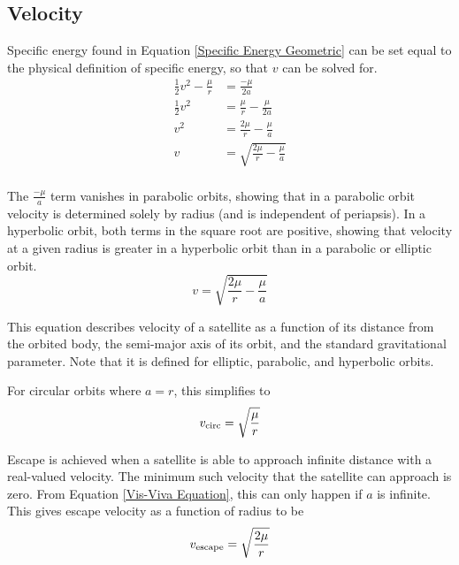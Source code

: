 \documentclass[../basicOrbitalDynamics.tex]{subfiles}
\begin{document}
\bigskip\bigskip
\subsection{Velocity}\label{sec:Velocity}

Specific energy found in Equation  \eqref{Specific Energy Geometric} can be set equal to the physical definition of specific energy, so that $v$ can be solved for.
\begin{align*}
    \frac{1}{2}v^2-\frac{\mu}{r} & =\frac{-\mu}{2a}                     \\
    \frac{1}{2}v^2               & =\frac{\mu}{r}-\frac{\mu}{2a}        \\
    v^2                          & =\frac{2\mu}{r}-\frac{\mu}{a}        \\
    v                            & =\sqrt{\frac{2\mu}{r}-\frac{\mu}{a}} \\
\end{align*}

The $\frac{-\mu}{a}$ term vanishes in parabolic orbits, showing that in a parabolic orbit velocity is determined solely by radius (and is independent of periapsis). In a hyperbolic orbit, both terms in the square root are positive, showing that velocity at a given radius is greater in a hyperbolic orbit than in a parabolic or elliptic orbit.
\begin{equation}\label{Vis-Viva Equation}
    v= \sqrt{\frac{2\mu}{r}-\frac{\mu}{a}}
\end{equation}

This equation describes velocity of a satellite as a function of its distance from the orbited body, the semi-major axis of its orbit, and the standard gravitational parameter. Note that it is defined for elliptic, parabolic, and hyperbolic orbits.

For circular orbits where $a=r$, this simplifies to
\begin{equation}\label{Circular Velocity}
    {v}_\text{circ} = \sqrt{\frac{\mu}{r}}
\end{equation}

Escape is achieved when a satellite is able to approach infinite distance with a real-valued velocity. The minimum such velocity that the satellite can approach is zero. From Equation \eqref{Vis-Viva Equation}, this can only happen if $a$ is infinite. This gives escape velocity as a function of radius to be
\begin{equation}\label{Escape velocity}
    {v}_\text{escape}=\sqrt{\frac{2\mu}{r}}
\end{equation}
\end{document}
